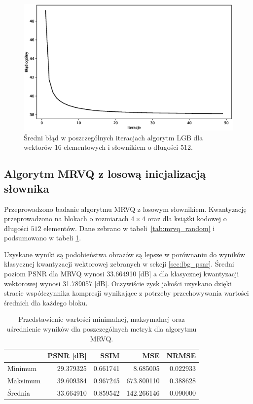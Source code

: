 \documentclass{article}
\begin{document}
\begin{figure}[H]
  \centering
  \includegraphics[width=.9\linewidth]{images/lbg_4x4_32_mean_iterations.eps}
  \caption{Średni błąd w poszczególnych iteracjach algorytm LGB dla wektorów 16 elementowych i słownikiem o długości 512.}
  \label{fig:lbg_iterations_mean}
\end{figure}

\subsection{Algorytm MRVQ z losową inicjalizacją słownika}

Przeprowadzono badanie algorytmu MRVQ z losowym słownikiem. Kwantyzację przeprowadzono na blokach o rozmiarach $4 \times 4$ oraz dla książki
kodowej o długości $512$ elementów. Dane zebrano w \mbox{tabeli \ref{tab:mrvq_random}} i podsumowano w tabeli \mbox{\ref{tab:mrvq_summary}}.

Uzyskane wyniki są podobieństwa obrazów są lepsze w porównaniu do wyników klasycznej kwantyzacji wektorowej zebranych w sekcji \ref{sec:lbg_psnr}. Średni poziom PSNR dla MRVQ wynosi 33.664910 [dB] a dla klasycznej kwantyzacji wektorowej wynosi 31.789057 [dB]. Oczywiście zysk jakości uzyskano dzięki stracie współczynnika kompresji wynikające z potrzeby przechowywania wartości średnich dla każdego bloku.

\begin{table}[h]
  \caption{Przedstawienie wartości minimalnej, maksymalnej oraz uśrednienie wyników dla poszczególnych metryk dla algorytmu MRVQ.}
  \label{tab:mrvq_summary}
  \centering
  \begin{tabular}{@{}lrrrr@{}}
    \toprule
             & PSNR {[}dB{]} & SSIM     & MSE        & NRMSE    \\ \midrule
    Minimum  & 29.379325     & 0.661741 & 8.685005   & 0.022933 \\
    Maksimum & 39.609384     & 0.967245 & 673.800110 & 0.388628 \\
    Średnia  & 33.664910     & 0.859542 & 142.266146 & 0.090000 \\
    \bottomrule
  \end{tabular}
\end{table}
\end{document}
